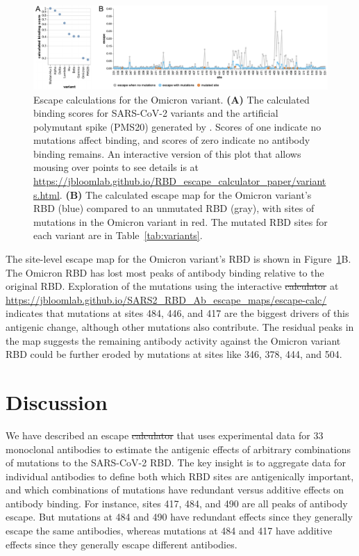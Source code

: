 \documentclass[9pt,twocolumn,twoside]{gsajnl_modified}
\providecommand{\DIFadd}[1]{{\protect\color{blue}\uwave{#1}}} %
\providecommand{\DIFdel}[1]{{\protect\color{red}\sout{#1}}}                      %
\providecommand{\DIFaddbegin}{} %
\providecommand{\DIFaddend}{} %
\providecommand{\DIFdelbegin}{} %
\providecommand{\DIFdelend}{} %
\begin{document}
\begin{figure}
\includegraphics[width=\linewidth]{figures/Omicron/Omicron.pdf}
\caption{Escape calculations for the Omicron variant.
{\bf (A)} The calculated binding scores for SARS-CoV-2 variants and the artificial polymutant spike (PMS20) generated by \citet{schmidt2021high}.
Scores of one indicate no mutations affect binding, and scores of zero indicate no antibody binding remains.
An interactive version of this plot that allows mousing over points to see details is at \url{https://jbloomlab.github.io/RBD_escape_calculator_paper/variants.html}.
{\bf (B)} The calculated escape map for the Omicron variant's RBD (blue) compared to an unmutated RBD (gray), with sites of mutations in the Omicron variant in red.
The mutated RBD sites for each variant are in Table~\ref{tab:variants}.
}
\label{fig:Omicron}
\end{figure}

The site-level escape map for the Omicron variant's RBD is shown in Figure~\ref{fig:Omicron}B.
The Omicron RBD has lost most peaks of antibody binding relative to the original RBD.
Exploration of the mutations using the interactive \DIFdelbegin \DIFdel{calculator }\DIFdelend \DIFaddbegin \DIFadd{estimator }\DIFaddend at \url{https://jbloomlab.github.io/SARS2_RBD_Ab_escape_maps/escape-calc/} indicates that mutations at sites 484, 446, and 417 are the biggest drivers of this antigenic change, although other mutations also contribute.
The residual peaks in the map suggests the remaining antibody activity against the Omicron variant RBD could be further eroded by mutations at sites like 346, 378, 444, and 504.

\section{Discussion}
We have described an escape \DIFdelbegin \DIFdel{calculator }\DIFdelend \DIFaddbegin \DIFadd{estimator }\DIFaddend that uses experimental data for 33 monoclonal antibodies to estimate the antigenic effects of arbitrary combinations of mutations to the SARS-CoV-2 RBD.
The key insight is to aggregate data for individual antibodies to define both which RBD sites are antigenically important, and which combinations of mutations have redundant versus additive effects on antibody binding.
For instance, sites 417, 484, and 490 are all peaks of antibody escape.
But mutations at 484 and 490 have redundant effects since they generally escape the same antibodies, whereas mutations at 484 and 417 have additive effects since they generally escape different antibodies.
\end{document}
